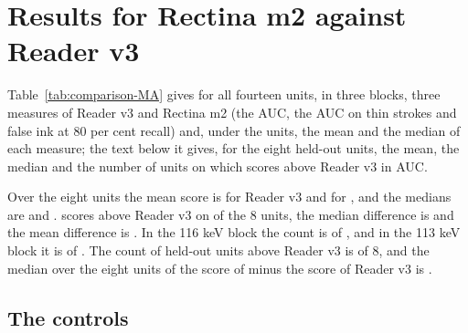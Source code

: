 \section{Results for Rectina m2 against Reader v3}\label{sec:results-MA}

Table~\ref{tab:comparison-MA} gives for all fourteen units, in three blocks, three measures of Reader v3 and Rectina m2 (the
AUC, the AUC on thin strokes and false ink at 80 per cent recall) and, under the units, the mean and the median of
each measure; the text below it gives, for the eight held-out units, the mean, the median and the number of units on
which \MAModelName{} scores above Reader v3 in AUC.

\MARuleSentence{} \RuleCounts{}

\begin{table}[!t]
\caption{Three measures of \MAModelName{} against Reader v3 on the fourteen units, target a: the AUC, the AUC on thin
strokes and false ink at 80 per cent recall. The cell of \MAModelName{} gives in parentheses the signed difference
against Reader v3. The rows Mean and Median are taken \MAStatScope; the
block of the community labels is information only.}\label{tab:comparison-MA}
\centering

\par\smallskip
{\footnotesize\raggedright\par}
\end{table}

Over the eight units the mean score is \MAHeldMeanReader{} for Reader v3 and \MAHeldMeanModel{} for \MAModelName{}, and the
medians are \MAHeldMedianReader{} and \MAHeldMedianModel{}. \MAModelName{} scores above Reader v3 on \MAHeldAbove{} of the 8
units, the median difference is \MAHeldMedianDiff{} and the mean difference is \MAHeldMeanDiff{}\MALowHeld. In the 116 keV
block the count is \MABlockLongAbove{} of \MABlockLongN{}, and in the 113 keV block it is \MABlockShortAbove{} of
\MABlockShortN{}. The count of held-out units above Reader v3 is \MAHeldAbove{} of 8, and the median over the eight units of the score of
\MAModelName{} minus the score of Reader v3 is \MARuleMedianGain{}.

\MASentAll{}

\MAFalseInkParagraph{}

\MAStatsParagraph{} \MASelectionSentence{} \VariantsSentence{} \MASeedParagraph{}

\subsection{The controls}\label{sec:controls-MA}

